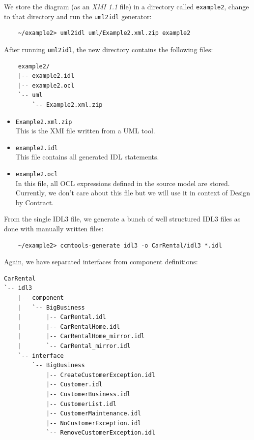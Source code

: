 We store the diagram (as an {\it XMI 1.1} file) in a directory called 
{\tt example2}, change to that directory and run the {\tt uml2idl} generator:
\begin{small}
\begin{verbatim}
    ~/example2> uml2idl uml/Example2.xml.zip example2
\end{verbatim}
\end{small}
After running {\tt uml2idl}, the new directory contains the following files:
\begin{small}
\begin{verbatim}
    example2/
    |-- example2.idl
    |-- example2.ocl
    `-- uml
        `-- Example2.xml.zip
\end{verbatim}
\end{small}

\newpage
\begin{itemize}
\item {\tt Example2.xml.zip}\\
This is the XMI file written from a UML tool.

\item {\tt example2.idl}\\ 
This file contains all generated IDL statements. 

\item {\tt example2.ocl} \\
In this file, all OCL expressions defined in the source model are stored.
Currently, we don't care about this file but we will use it in context of
Design by Contract. 
\end{itemize}

From the single IDL3 file, we generate a bunch of well structured 
IDL3 files as done with manually written files:
\begin{small}
\begin{verbatim}
    ~/example2> ccmtools-generate idl3 -o CarRental/idl3 *.idl
\end{verbatim}
\end{small}

Again, we have separated interfaces from component definitions:
\begin{small}
\begin{verbatim}
CarRental
`-- idl3
    |-- component
    |   `-- BigBusiness
    |       |-- CarRental.idl
    |       |-- CarRentalHome.idl
    |       |-- CarRentalHome_mirror.idl
    |       `-- CarRental_mirror.idl
    `-- interface
        `-- BigBusiness
            |-- CreateCustomerException.idl
            |-- Customer.idl
            |-- CustomerBusiness.idl
            |-- CustomerList.idl
            |-- CustomerMaintenance.idl
            |-- NoCustomerException.idl
            `-- RemoveCustomerException.idl
\end{verbatim}
\end{small}

